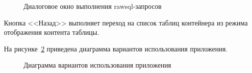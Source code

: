 \begin{figure}[h!]
\caption{Диалоговое окно выполнения rawsql-запросов}
\label{3:raw}
\end{figure}

Кнопка <<Назад>> выполняет переход на список таблиц контейнера из режима отображения контента таблицы.

На рисунке~\ref{3:usecase} приведена диаграмма вариантов использования приложения.
\begin{figure}[h!]
\caption{Диаграмма вариантов использования приложения}
\label{3:usecase}
\end{figure}
